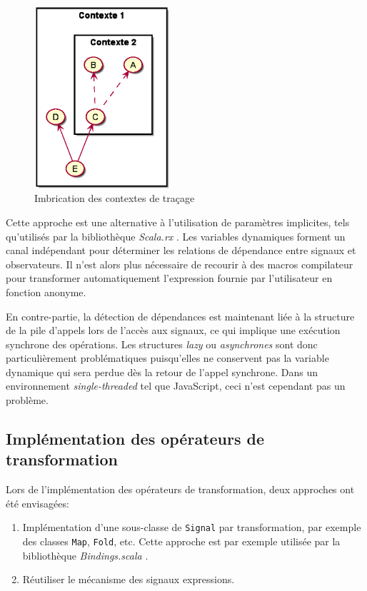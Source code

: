 \begin{figure}[h]
	\centering
	\includegraphics[width=5cm]{img/signals_nested_tracing.eps}
	\caption{Imbrication des contextes de traçage}
	\label{fig:sig-nested-tracing}
\end{figure}

Cette approche est une alternative à l'utilisation de paramètres implicites, tels qu'utilisés par la bibliothèque \emph{Scala.rx} \cite{scala.rx}. Les variables dynamiques forment un canal indépendant pour déterminer les relations de dépendance entre signaux et observateurs. Il n'est alors plus nécessaire de recourir à des macros compilateur pour transformer automatiquement l'expression fournie par l'utilisateur en fonction anonyme.

En contre-partie, la détection de dépendances est maintenant liée à la structure de la pile d'appels lors de l'accès aux signaux, ce qui implique une exécution synchrone des opérations. Les structures \emph{lazy} ou \emph{asynchrones} sont donc particulièrement problématiques puisqu'elles ne conservent pas la variable dynamique qui sera perdue dès la retour de l'appel synchrone. Dans un environnement \emph{single-threaded} tel que JavaScript, ceci n'est cependant pas un problème.

\subsection{Implémentation des opérateurs de transformation}

Lors de l'implémentation des opérateurs de transformation, deux approches ont été envisagées:
\begin{enumerate}
	\item Implémentation d'une sous-classe de \texttt{Signal} par transformation, par exemple des classes \texttt{Map}, \texttt{Fold}, etc. Cette approche est par exemple utilisée par la bibliothèque \emph{Bindings.scala} \cite{binding.scala}.
	\item Réutiliser le mécanisme des signaux expressions.
\end{enumerate}

